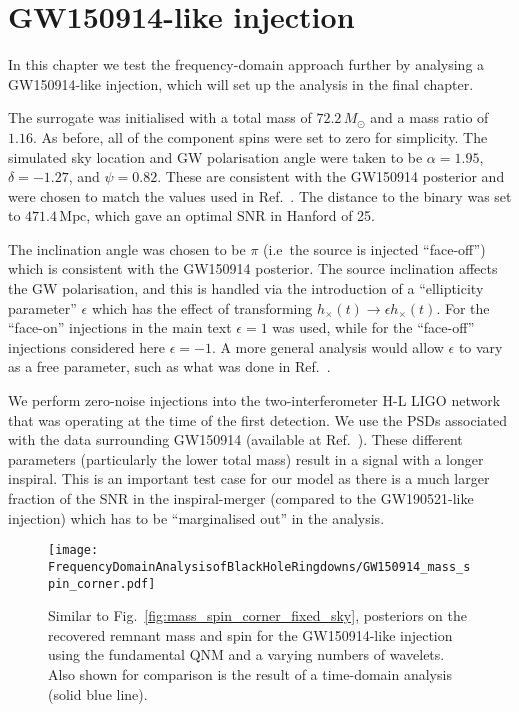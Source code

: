 \section{GW150914-like injection}\label{app:GW150914}

In this chapter we test the frequency-domain approach further by analysing a GW150914-like injection, which will set up the analysis in the final chapter.

The surrogate was initialised with a total mass of $72.2\,M_\odot$ and a mass ratio of $1.16$. 
As before, all of the component spins were set to zero for simplicity. 
The simulated sky location and GW polarisation angle were taken to be $\alpha = 1.95$, $\delta = -1.27$, and $\psi = 0.82$. These are consistent with the GW150914 posterior and were chosen to match the values used in Ref.~\cite{Isi:2019aib}.
The distance to the binary was set to $471.4\,\mathrm{Mpc}$, which gave an optimal SNR in Hanford of 25.

The inclination angle was chosen to be $\pi$ (i.e\ the source is injected ``face-off'') which is consistent with the GW150914 posterior.
The source inclination affects the GW polarisation, and this is handled via the introduction of a ``ellipticity parameter'' $\epsilon$ which has the effect of transforming $h_\times(t) \rightarrow \epsilon h_\times(t)$.
For the ``face-on'' injections in the main text $\epsilon=1$ was used, while for the ``face-off'' injections considered here $\epsilon=-1$.
A more general analysis would allow $\epsilon$ to vary as a free parameter, such as what was done in Ref.~\cite{Isi:2021iql}.

We perform zero-noise injections into the two-interferometer H-L LIGO network that was operating at the time of the first detection. 
We use the PSDs associated with the data surrounding GW150914 (available at Ref.~\cite{gwtc1psds}).
These different parameters (particularly the lower total mass) result in a signal with a longer inspiral.
This is an important test case for our model as there is a much larger fraction of the SNR in the inspiral-merger (compared to the GW190521-like injection) which has to be ``marginalised out'' in the analysis.

\begin{figure}[t!]
    \centering
    \texttt{[image: FrequencyDomainAnalysisofBlackHoleRingdowns/GW150914\_mass\_spin\_corner.pdf]}
    \caption[Similar to Fig.~\ref{fig:mass_spin_corner_fixed_sky}, posteriors on the recovered remnant mass and spin for the GW150914-like injection using the fundamental QNM and a varying numbers of wavelets]{ 
    Similar to Fig.~\ref{fig:mass_spin_corner_fixed_sky}, posteriors on the recovered remnant mass and spin for the GW150914-like injection using the fundamental QNM and a varying numbers of wavelets. 
    Also shown for comparison is the result of a time-domain analysis (solid blue line).
    }
    \label{fig:GW150914_mass_spin_corner}
\end{figure}

